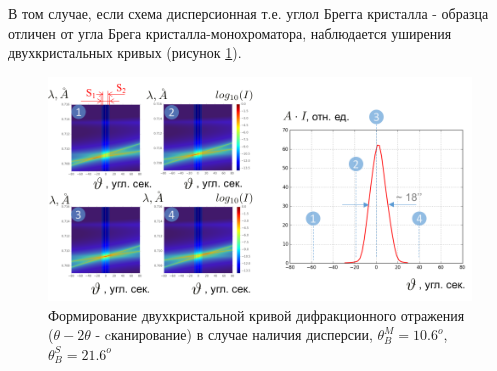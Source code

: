 В том случае, если схема дисперсионная т.е. углол Брегга кристалла - образца отличен от угла Брега кристалла-монохроматора,
наблюдается уширения двухкристальных кривых (рисунок \ref{ris:double_crystal_form_kdo_dissp}).
 \begin{figure}[H]
   \centering
   \includegraphics[width=1\textwidth]{images/double_crystal_form_kdo_dissp.png}
   \caption{Формирование двухкристальной кривой дифракционного отражения ($\theta - 2\theta$ - cканирование) в случае
   наличия дисперсии, $\theta_B^M = 10.6^o$, $\theta_B^S = 21.6^o$ }
   \label{ris:double_crystal_form_kdo_dissp}
 \end{figure}
